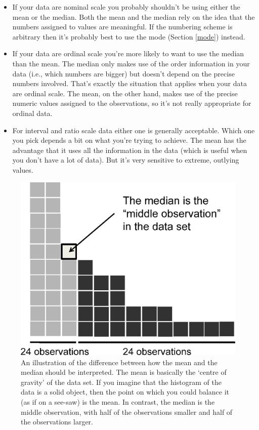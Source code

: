 \documentclass[
]{book}
\providecommand{\tightlist}{%
  \setlength{\itemsep}{0pt}\setlength{\parskip}{0pt}}
\begin{document}
\begin{itemize}
\tightlist
\item
  If your data are nominal scale you probably shouldn't be using either the mean or the median. Both the mean and the median rely on the idea that the numbers assigned to values are meaningful. If the numbering scheme is arbitrary then it's probably best to use the mode (Section \ref{mode}) instead.
\item
  If your data are ordinal scale you're more likely to want to use the median than the mean. The median only makes use of the order information in your data (i.e., which numbers are bigger) but doesn't depend on the precise numbers involved. That's exactly the situation that applies when your data are ordinal scale. The mean, on the other hand, makes use of the precise numeric values assigned to the observations, so it's not really appropriate for ordinal data.
\item
  For interval and ratio scale data either one is generally acceptable. Which one you pick depends a bit on what you're trying to achieve. The mean has the advantage that it uses all the information in the data (which is useful when you don't have a lot of data). But it's very sensitive to extreme, outlying values.
\end{itemize}

\begin{figure}
\centering
\includegraphics{img/descriptives2/median.eps}
\caption{\label{fig:meanmedian}An illustration of the difference between how the mean and the median should be interpreted. The mean is basically the `centre of gravity' of the data set. If you imagine that the histogram of the data is a solid object, then the point on which you could balance it (as if on a see-saw) is the mean. In contrast, the median is the middle observation, with half of the observations smaller and half of the observations larger.}
\end{figure}
\end{document}
